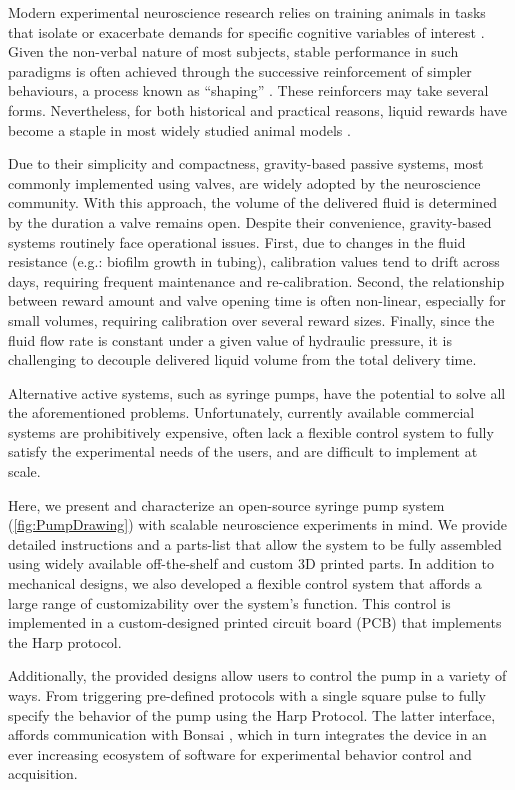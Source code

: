 Modern experimental neuroscience research relies on training animals in tasks that isolate or exacerbate demands for specific cognitive variables of interest \citep{Gomez-Marin2016}. Given the non-verbal nature of most subjects, stable performance in such paradigms is often achieved through the successive reinforcement of simpler behaviours, a process known as “shaping” \citep{Jones1939}. These reinforcers may take several forms. Nevertheless, for both historical and practical reasons, liquid rewards have become a staple in most widely studied animal models \citep{Guo2014}. 

Due to their simplicity and compactness, gravity-based passive systems, most commonly implemented using valves, are widely adopted by the neuroscience community. With this approach, the volume of the delivered fluid is determined by the duration a valve remains open. Despite their convenience, gravity-based systems routinely face operational issues. First, due to changes in the fluid resistance (e.g.: biofilm growth in tubing), calibration values tend to drift across days, requiring frequent maintenance and re-calibration. Second, the relationship between reward amount and valve opening time is often non-linear, especially for small volumes, requiring calibration over several reward sizes. Finally, since the fluid flow rate is constant under a given value of hydraulic pressure, it is challenging to decouple delivered liquid volume from the total delivery time.

Alternative active systems, such as syringe pumps, have the potential to solve all the aforementioned problems. Unfortunately, currently available commercial systems are prohibitively expensive, often lack a flexible control system to fully satisfy the experimental needs of the users, and are difficult to implement at scale.

Here, we present and characterize an open-source syringe pump system (\cref{fig:PumpDrawing}) with scalable neuroscience experiments in mind. We provide detailed instructions and a parts-list that allow the system to be fully assembled using widely available off-the-shelf and custom 3D printed parts. 
In addition to mechanical designs, we also developed a flexible control system that affords a large range of customizability over the system's function. This control is implemented in a custom-designed printed circuit board (PCB) that implements the Harp protocol.

Additionally, the provided designs allow users to control the pump in a variety of ways. From triggering pre-defined protocols with a single square pulse to fully specify the behavior of the pump using the Harp Protocol. The latter interface, affords communication with Bonsai \citep{Lopes2015}, which in turn integrates the device in an ever increasing ecosystem of software for experimental behavior control and acquisition.

